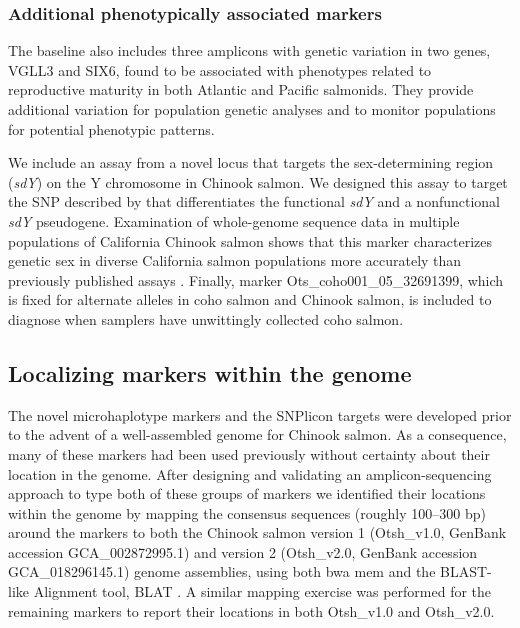 \subsubsection*{Additional phenotypically associated markers}

The baseline also includes three amplicons with genetic variation
in two genes, VGLL3 and SIX6,
found to be associated with phenotypes related to reproductive maturity in both
Atlantic \citep{barson2015sex} and Pacific \citep{waters2021heterogeneous} salmonids. They
provide additional variation for population genetic analyses and to
monitor populations for potential phenotypic patterns.

We include an assay from a novel locus that targets the sex-determining region ({\em sdY}) on the Y chromosome in Chinook salmon. We designed this assay to target the SNP described by \citet{bertho2022nonfunctional} that differentiates the functional {\em sdY} and a nonfunctional {\em sdY} pseudogene.  Examination of whole-genome sequence data in multiple populations of California Chinook salmon \citep{thompson2020complex} shows that this
marker characterizes genetic sex in diverse California salmon populations more accurately than previously published assays  \citep{von2015development}.
Finally, marker Ots\_coho001\_05\_32691399, which is fixed for alternate alleles in
coho salmon and Chinook salmon, is included to diagnose when samplers have unwittingly
collected coho salmon.

\subsection*{Localizing markers within the genome}

The novel microhaplotype markers and the SNPlicon targets were
developed prior to the advent of a well-assembled genome for Chinook salmon.
As a consequence, many of these markers had
been used previously without certainty about their location in the genome.
After designing and validating an amplicon-sequencing approach to type both of these
groups of markers we identified their locations within the genome by mapping the
consensus sequences (roughly 100--300 bp) around the markers
to both the Chinook salmon version 1 (Otsh\_v1.0, GenBank accession GCA\_002872995.1)
and version 2  (Otsh\_v2.0, GenBank accession GCA\_018296145.1) genome assemblies,
using both bwa mem and the BLAST-like Alignment tool, BLAT \citep{kent2002blat}.
A similar mapping exercise was performed for the remaining markers to
report their locations in both Otsh\_v1.0 and Otsh\_v2.0.


